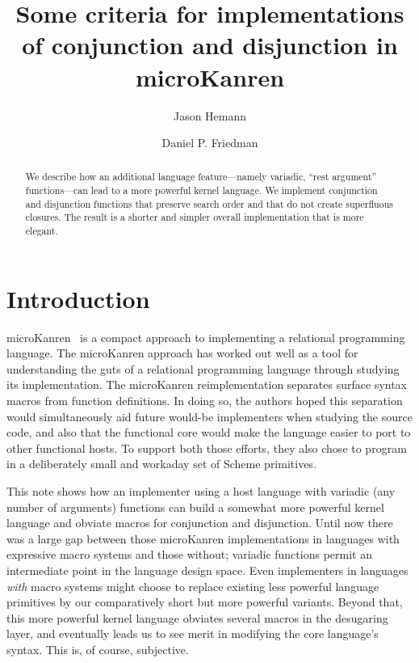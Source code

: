 \documentclass[sigplan,screen,draft,anonymous,review,natbib=false]{acmart}
\begin{document}
\title[Some criteria for implementations of conj and disj in
microKanren]{Some criteria for implementations of conjunction and
  disjunction in microKanren}

\author{Jason Hemann}
\author{Daniel P. Friedman}

\renewcommand{\shortauthors}{Hemann et al.}

\begin{abstract}
  We describe how an additional language feature---namely variadic,
  \enquote{rest argument} functions---can lead to a more powerful
  kernel language. We implement conjunction and disjunction functions
  that preserve search order and that do not create superfluous
  closures. The result is a shorter and simpler overall implementation
  that is more elegant.
\end{abstract}

\keywords{}

\maketitle

\section{Introduction}

microKanren~\cite{hemann2013muKanren} is a compact approach to
implementing a relational programming language. The microKanren
approach has worked out well as a tool for understanding the guts of a
relational programming language through studying its implementation.
The microKanren reimplementation separates surface syntax macros from
function definitions. In doing so, the authors hoped this separation
would simultaneously aid future would-be implementers when studying
the source code, and also that the functional core would make the
language easier to port to other functional hosts. To support both
those efforts, they also chose to program in a deliberately small and
workaday set of Scheme primitives.

This note shows how an implementer using a host language with variadic
(any number of arguments) functions can build a somewhat more powerful
kernel language and obviate macros for conjunction and disjunction.
Until now there was a large gap between those microKanren
implementations in languages with expressive macro systems and those
without; variadic functions permit an intermediate point in the
language design space. Even implementers in languages \emph{with}
 macro systems might choose to replace existing less
powerful language primitives by our comparatively short but more
powerful variants. Beyond that, this more powerful kernel language
obviates several macros in the desugaring layer, and eventually leads
us to see merit in modifying the core language's syntax. This is, of
course, subjective.
\end{document}
